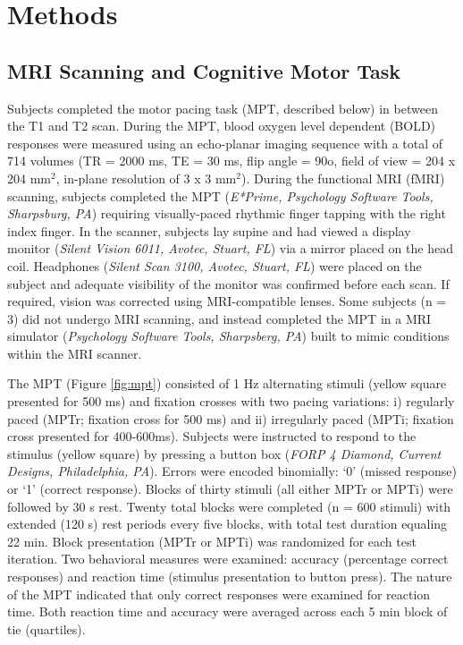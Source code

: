 \section{Methods}

\subsection{MRI Scanning and Cognitive Motor Task}
Subjects completed the motor pacing task (MPT, described below) in between the T1 and T2 scan. During the MPT, blood oxygen level dependent (BOLD) responses were measured using an echo-planar imaging sequence with a total of 714 volumes (TR = 2000 ms, TE = 30 ms, flip angle = 90o, field of view = 204 x 204 mm${^2}$, in-plane resolution of 3 x 3 mm${^2}$). During the functional MRI (fMRI) scanning, subjects completed the MPT (\textit{E*Prime, Psychology Software Tools, Sharpsburg, PA}) requiring visually-paced rhythmic finger tapping with the right index finger. In the scanner, subjects lay supine and had viewed a display monitor (\textit{Silent Vision 6011, Avotec, Stuart, FL}) via a mirror placed on the head coil. Headphones (\textit{Silent Scan 3100, Avotec, Stuart, FL}) were placed on the subject and adequate visibility of the monitor was confirmed before each scan. If required, vision was corrected using MRI-compatible lenses. Some subjects (n = 3) did not undergo MRI scanning, and instead completed the MPT in a MRI simulator (\textit{Psychology Software Tools, Sharpsberg, PA}) built to mimic conditions within the MRI scanner.

The MPT (Figure \ref{fig:mpt}) consisted of 1 Hz alternating stimuli (yellow square presented for 500 ms) and fixation crosses with two pacing variations: i) regularly paced (MPTr; fixation cross for 500 ms) and ii) irregularly paced (MPTi; fixation cross presented for 400-600ms). Subjects were instructed to respond to the stimulus (yellow square) by pressing a button box (\textit{FORP 4 Diamond, Current Designs, Philadelphia, PA}). Errors were encoded binomially: ‘0’ (missed response) or ‘1’ (correct response). Blocks of thirty stimuli (all either MPTr or MPTi) were followed by 30 s rest. Twenty total blocks were completed (n = 600 stimuli) with extended (120 s) rest periods every five blocks, with total test duration equaling ~ 22 min. Block presentation (MPTr or MPTi) was randomized for each test iteration. Two behavioral measures were examined: accuracy (percentage correct responses) and reaction time (stimulus presentation to button press). The nature of the MPT indicated that only correct responses were examined for reaction time. Both reaction time and accuracy were averaged across each 5 min block of tie (quartiles).

